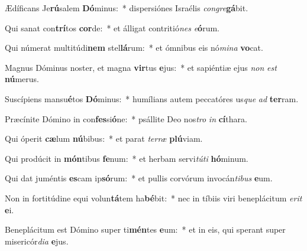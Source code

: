 \item Ædíficans Je\textbf{rú}salem \textbf{Dó}minus:~* dispersiónes Israélis \textit{con}\textit{gre}\textbf{gá}bit.
\item Qui sanat con\textbf{trí}tos \textbf{cor}de:~* et álligat contritió\textit{nes} \textit{e}\textbf{ó}rum.
\item Qui númerat multitúdi\textbf{nem} stel\textbf{lá}rum:~* et ómnibus eis nó\textit{mi}\textit{na} \textbf{vo}cat.
\item Magnus Dóminus noster, et magna \textbf{vir}tus \textbf{e}jus:~* et sapiéntiæ ejus \textit{non} \textit{est} \textbf{nú}merus.
\item Suscípiens mansu\textbf{é}tos \textbf{Dó}minus:~* humílians autem peccatóres us\textit{que} \textit{ad} \textbf{ter}ram.
\item Præcínite Dómino in con\textbf{fes}si\textbf{ó}ne:~* psállite Deo nos\textit{tro} \textit{in} \textbf{cí}thara.
\item Qui óperit \textbf{cæ}lum \textbf{nú}bibus:~* et parat \textit{ter}\textit{ræ} \textbf{plú}viam.
\item Qui prodúcit in \textbf{món}tibus \textbf{fe}num:~* et herbam servi\textit{tú}\textit{ti} \textbf{hó}minum.
\item Qui dat juméntis \textbf{es}cam ip\textbf{só}rum:~* et pullis corvórum invocán\textit{ti}\textit{bus} \textbf{e}um.
\item Non in fortitúdine equi volun\textbf{tá}tem ha\textbf{bé}bit:~* nec in tíbiis viri beneplácitum \textit{e}\textit{rit} \textbf{e}i.
\item Beneplácitum est Dómino super ti\textbf{mén}tes \textbf{e}um:~* et in eis, qui sperant super misericór\textit{di}\textit{a} \textbf{e}jus.
